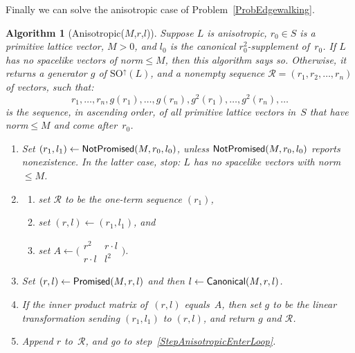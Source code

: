 \documentclass[12pt]{amsart}
\def\twobytwo#1#2#3#4{\bigl(\begin{smallmatrix}#1&#2\\#3&#4\end{smallmatrix}\bigr)
    }
\def\calR{\mathcal{R}}
\def\SO{\mathrm{SO}}
\def\SOup{\SO^{\uparrow}}
\def\SOup{\mathrm{SO}^{\uparrow}}
\numberwithin{theorem}{section}
\numberwithin{equation}{section}
\numberwithin{figure}{section}
\newtheorem{algorithm}[theorem]{Algorithm}
\theoremstyle{remark}
\begin{document}
Finally we can solve the anisotropic case of Problem~\ref{ProbEdgewalking}.  

\begin{algorithm}[{\sf Anisotropic($M$,$r$,$l$)}]
    \label{AlgorithmAnisotropic}
    Suppose $L$ is anisotropic, $r_0\in S$ is a primitive lattice vector, $M>0$, and
    $l_0$ is the canonical $r_0^2$-supplement of~$r_0$.  If $L$ has no spacelike vectors of
    norm${}\leq M$, then this algorithm says so.  Otherwise, it
    returns a generator  $g$ of
    $\SOup(L)$, and a nonempty sequence $\calR=(r_1,r_2,\dots,r_n)$ of vectors, such that:
    $$
    r_1,\dots,r_n,g(r_1),\dots,g(r_n),g^2(r_1),\dots,g^2(r_n),\dots
    $$
    is the sequence, in ascending order, of all
    primitive lattice vectors in~$S$ that have norm${}\leq M$
    and come after~$r_0$.

    \begin{enumerate}
        \item\relax{\sf [Nonexistence?]}
            \label{StepAnisotropicNonexistence}
            Set $(r_1,l_1)\leftarrow{\sf NotPromised}(M,r_0,l_0)$,
unless  ${\sf NotPromised}(M,r_0,l_0)$ reports nonexistence.  In the latter case,
            stop: $L$ has no spacelike vectors with norm${}\leq M$.  
        \item\relax{\sf [Initialize]} 
            \label{StepAnisotropicIntialize}
            \begin{enumerate} 
                \item
                    set $\calR$ to be the one-term sequence $(r_1)$,
                \item
                    set $(r,l)\leftarrow(r_1,l_1)$, and 
                \item
                    set $A\leftarrow\twobytwo{r^2}{r\cdot l}{r\cdot l}{l^2}$.
            \end{enumerate}
        \item{}
            \label{StepAnisotropicEnterLoop}
            Set $(r,l)\leftarrow{\sf Promised}(M,r,l)$ and then
            $l\leftarrow{\sf Canonical}(M,r,l)$.  
        \item\relax{\sf [Done?]}
            \label{StepAnisotropicDone}
            If the inner product matrix of~$(r,l)$ equals~$A$, then set
            $g$ to be the linear transformation sending $(r_1,l_1)$
            to $(r,l)$, and return $g$ and $\calR$.
        \item{}
            \label{StepAnisotropicAppendRepeat}
            Append $r$ to~$\calR$, and go to step~\ref{StepAnisotropicEnterLoop}.
    \end{enumerate}
\end{algorithm}
\end{document}

